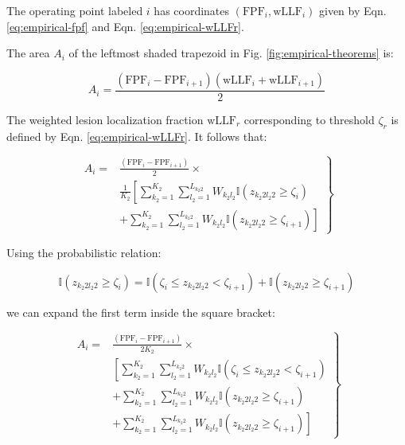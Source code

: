 \documentclass[
]{book}
\begin{document}
The operating point labeled \(i\) has coordinates \(\left ( \text{FPF}_i, \text{wLLF}_i \right )\) given by Eqn. \eqref{eq:empirical-fpf} and Eqn. \eqref{eq:empirical-wLLFr}.

The area \(A_i\) of the leftmost shaded trapezoid in Fig. \ref{fig:empirical-theorems} is:

\begin{equation}
A_i = \frac{\left (\text{FPF}_i - \text{FPF}_{i+1}\right )\left (\text{wLLF}_i + \text{wLLF}_{i+1}\right )}{2}
\label{eq:empirical-auc-1}
\end{equation}

The weighted lesion localization fraction \(\text{wLLF}_r\) corresponding to threshold \(\zeta_r\) is defined by Eqn. \eqref{eq:empirical-wLLFr}. It follows that:

\begin{equation}
\left. 
\begin{aligned}
A_i =&  \frac{\left (\text{FPF}_i - \text{FPF}_{i+1}\right )}{2} \times \\ 
& \frac{1}{K_2}\left[ \sum_{k_2=1}^{K_2}\sum_{l_2=1}^{L_{k_2 2}}W_{k_2 l_2} \mathbb{I}\left ( z_{k_2 2 l_2 2} \geq \zeta_i \right ) \right. \\
&+ \left. \sum_{k_2=1}^{K_2}\sum_{l_2=1}^{L_{k_2 2}}W_{k_2 l_2} \mathbb{I}\left ( z_{k_2 2 l_2 2} \geq \zeta_{i+1} \right ) \right]  
\end{aligned}
\right \} 
\label{eq:empirical-theorem2}
\end{equation}

Using the probabilistic relation:

\begin{equation}
\mathbb{I}\left ( z_{k_2 2 l_2 2} \geq \zeta_i \right ) = \mathbb{I}\left ( \zeta_{i} \leq z_{k_2 2 l_2 2} < \zeta_{i+1} \right ) + \mathbb{I}\left ( z_{k_2 2 l_2 2} \geq \zeta_{i+1} \right )
\label{eq:empirical-appendix-1}
\end{equation}

we can expand the first term inside the square bracket:

\begin{equation}
\left. 
\begin{aligned}
A_i =&  \frac{\left (\text{FPF}_i - \text{FPF}_{i+1}\right )}{2K_2} \times \\ 
& \left[ \sum_{k_2=1}^{K_2}\sum_{l_2=1}^{L_{k_2 2}}W_{k_2 l_2} \mathbb{I}\left ( \zeta_{i} \leq z_{k_2 2 l_2 2} < \zeta_{i+1} \right ) \right. \\
&+ \sum_{k_2=1}^{K_2}\sum_{l_2=1}^{L_{k_2 2}}W_{k_2 l_2} \mathbb{I}\left ( z_{k_2 2 l_2 2} \geq \zeta_{i+1} \right ) \\ 
&+ \left. \sum_{k_2=1}^{K_2}\sum_{l_2=1}^{L_{k_2 2}}W_{k_2 l_2} \mathbb{I}\left ( z_{k_2 2 l_2 2} \geq \zeta_{i+1} \right ) \right]  
\end{aligned}
\right \} 
\end{equation}
\end{document}
